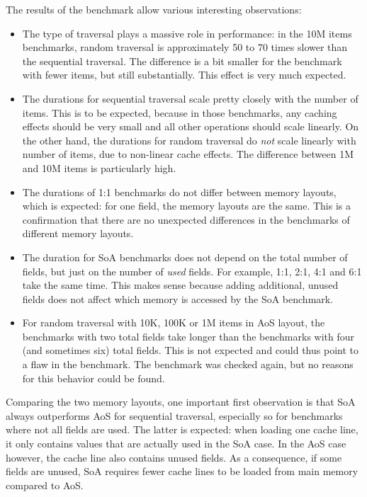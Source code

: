 \newpage

The results of the benchmark allow various interesting observations:

\begin{itemize}
  \item The type of traversal plays a massive role in performance: in the 10M items benchmarks, random traversal is approximately 50 to 70 times slower than the sequential traversal.
  The difference is a bit smaller for the benchmark with fewer items, but still substantially.
  This effect is very much expected.
  \item The durations for sequential traversal scale pretty closely with the number of items.
  This is to be expected, because in those benchmarks, any caching effects should be very small and all other operations should scale linearly.
  On the other hand, the durations for random traversal do \emph{not} scale linearly with number of items, due to non-linear cache effects.
  The difference between 1M and 10M items is particularly high.
  \item The durations of \textsf{1:1} benchmarks do not differ between memory layouts, which is expected: for one field, the memory layouts are the same.
  This is a confirmation that there are no unexpected differences in the benchmarks of different memory layouts.
  \item The duration for SoA benchmarks does not depend on the total number of fields, but just on the number of \emph{used} fields.
  For example, \textsf{1:1}, \textsf{2:1}, \textsf{4:1} and \textsf{6:1} take the same time.
  This makes sense because adding additional, unused fields does not affect which memory is accessed by the SoA benchmark.
  \item For random traversal with 10K, 100K or 1M items in AoS layout, the benchmarks with two total fields take longer than the benchmarks with four (and sometimes six) total fields.
  This is not expected and could thus point to a flaw in the benchmark.
  The benchmark was checked again, but no reasons for this behavior could be found.
\end{itemize}

Comparing the two memory layouts, one important first observation is that SoA always outperforms AoS for sequential traversal, especially so for benchmarks where not all fields are used.
The latter is expected: when loading one cache line, it only contains values that are actually used in the SoA case.
In the AoS case however, the cache line also contains unused fields.
As a consequence, if some fields are unused, SoA requires fewer cache lines to be loaded from main memory compared to AoS.


